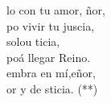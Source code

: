 \begin{cancion}%
	lo con tu amor, ñor,\\
	po vivir tu juscia, \\
	solou ticia,\\
	poá llegar Reino.\\
	embra en mí,eñor,\\
	or y  de sticia. (**)\\
\end{cancion}%
